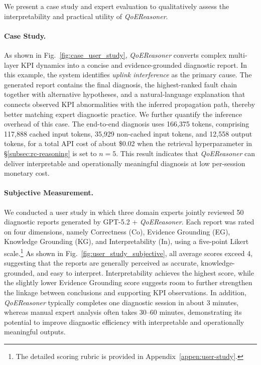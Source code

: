 \documentclass[sigconf,10pt]{acmart} %
\begin{document}
We present a case study and expert evaluation to qualitatively assess the interpretability and practical utility of \textit{QoEReasoner}.

\paragraph{Case Study.}
As shown in Fig.~\ref{fig:case_user_study}, \textit{QoEReasoner} converts complex multi-layer KPI dynamics into a concise and evidence-grounded diagnostic report. In this example, the system identifies \emph{uplink interference} as the primary cause. The generated report contains the final diagnosis, the highest-ranked fault chain together with alternative hypotheses, and a natural-language explanation that connects observed KPI abnormalities with the inferred propagation path, thereby better matching expert diagnostic practice.
We further quantify the inference overhead of this case. The end-to-end diagnosis uses 166{,}375 tokens, comprising 117{,}888 cached input tokens, 35{,}929 non-cached input tokens, and 12{,}558 output tokens, for a total API cost of about \$0.02 when the retrieval hyperparameter in \S\ref{subsec:rc-reasoning} is set to $n=5$. This result indicates that \textit{QoEReasoner} can deliver interpretable and operationally meaningful diagnosis at low per-session monetary cost.

\paragraph{Subjective Measurement.}
We conducted a user study in which three domain experts jointly reviewed 50 diagnostic reports generated by GPT-5.2 + \textit{QoEReasoner}. Each report was rated on four dimensions, namely Correctness (Co), Evidence Grounding (EG), Knowledge Grounding (KG), and Interpretability (In), using a five-point Likert scale.\footnote{The detailed scoring rubric is provided in Appendix~\ref{appen:user-study}.} As shown in Fig.~\ref{fig:user_study_subjective}, all average scores exceed 4, suggesting that the reports are generally perceived as accurate, knowledge-grounded, and easy to interpret. Interpretability achieves the highest score, while the slightly lower Evidence Grounding score suggests room to further strengthen the linkage between conclusions and supporting KPI observations. In addition, \textit{QoEReasoner} typically completes one diagnostic session in about 3 minutes, whereas manual expert analysis often takes 30--60 minutes, demonstrating its potential to improve diagnostic efficiency with interpretable and operationally meaningful outputs.
\end{document}
